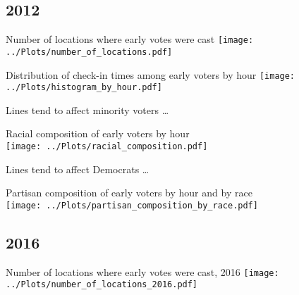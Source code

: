 \documentclass{beamer}
\begin{document}
		\subsection{2012}
		
		\begin{frame}				
		\end{frame}
		
		\begin{frame}
		 Number of locations where early votes were cast			
			\centering
			\texttt{[image: ../Plots/number\_of\_locations.pdf]}
		\end{frame}
	
		\begin{frame}	
		Distribution of check-in times among early voters by hour			
			\centering
			\texttt{[image: ../Plots/histogram\_by\_hour.pdf]}
		\end{frame}
		

		\begin{frame}				
		\centering Lines tend to affect minority voters \ldots
		\end{frame}

		\begin{frame}			
			\centering 
			Racial composition of early voters by hour	\\
			\texttt{[image: ../Plots/racial\_composition.pdf]}
		\end{frame}

		\begin{frame}				
		Lines tend to affect Democrats \ldots
		\end{frame}

		\begin{frame}			
			\centering 
			Partisan composition of early voters by hour and by race	\\
			\texttt{[image: ../Plots/partisan\_composition\_by\_race.pdf]}
		\end{frame}
		
		
		
		\subsection{2016}
		
		
		\begin{frame}				
			\centering 2016
		\end{frame}
		
		\begin{frame}				
		\centering 
		Number of locations where early votes were cast, 2016
		\texttt{[image: ../Plots/number\_of\_locations\_2016.pdf]}
		\end{frame}
		
\end{document}
